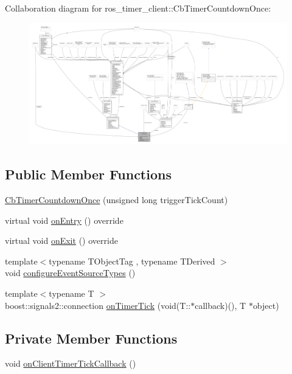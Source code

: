 Collaboration diagram for ros\+\_\+timer\+\_\+client\+:\+:Cb\+Timer\+Countdown\+Once\+:\nopagebreak
\begin{figure}[H]
\begin{center}
\leavevmode
\includegraphics[width=350pt]{classros__timer__client_1_1CbTimerCountdownOnce__coll__graph}
\end{center}
\end{figure}
\subsection*{Public Member Functions}
\begin{DoxyCompactItemize}
\item 
\hyperlink{classros__timer__client_1_1CbTimerCountdownOnce_a11e7697b1f41c26b01132617de3fdf76}{Cb\+Timer\+Countdown\+Once} (unsigned long trigger\+Tick\+Count)
\item 
virtual void \hyperlink{classros__timer__client_1_1CbTimerCountdownOnce_a06e15530538aed6ff5b55e75fe979907}{on\+Entry} () override
\item 
virtual void \hyperlink{classros__timer__client_1_1CbTimerCountdownOnce_af2d3d5b803e19cd843db010d0406503a}{on\+Exit} () override
\item 
{\footnotesize template$<$typename T\+Object\+Tag , typename T\+Derived $>$ }\\void \hyperlink{classros__timer__client_1_1CbTimerCountdownOnce_afe77e4b3a1cb798651426da4a720cff4}{configure\+Event\+Source\+Types} ()
\item 
{\footnotesize template$<$typename T $>$ }\\boost\+::signals2\+::connection \hyperlink{classros__timer__client_1_1CbTimerCountdownOnce_a38949571cf20ca88b4a1bac881399f21}{on\+Timer\+Tick} (void(T\+::$\ast$callback)(), T $\ast$object)
\end{DoxyCompactItemize}
\subsection*{Private Member Functions}
\begin{DoxyCompactItemize}
\item 
void \hyperlink{classros__timer__client_1_1CbTimerCountdownOnce_afe103d54afa6b6e7b89fc65447b69523}{on\+Client\+Timer\+Tick\+Callback} ()
\end{DoxyCompactItemize}
